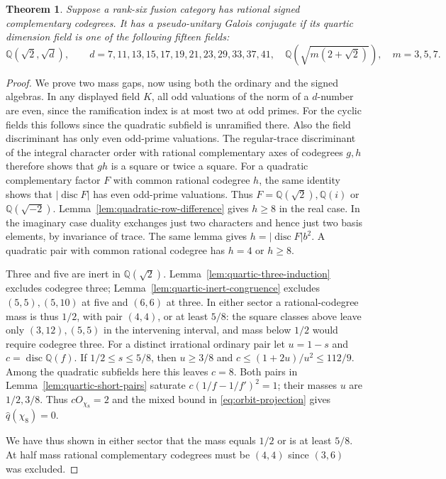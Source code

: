 \documentclass[11pt,reqno]{amsart}
\newtheorem{theorem}{Theorem}[section]
\theoremstyle{remark}\newtheorem{remark}[theorem]{Remark}
\numberwithin{equation}{section}
\begin{document}
\begin{theorem}\label{thm:quartic-fifteen-rational}
Suppose a rank-six fusion category has rational signed complementary
codegrees. It has a pseudo-unitary Galois conjugate if its quartic
dimension field is one of the following fifteen fields:
\[
 \mathbb Q(\sqrt2,\sqrt d),\qquad
 d=7,11,13,15,17,19,21,23,29,33,37,41,\quad \mathbb Q\!\left(\sqrt{m(2+\sqrt2)}\right),\quad m=3,5,7 .
\]
\end{theorem}
\begin{proof}
We prove two mass gaps, now using both the ordinary and the signed
algebras. In any displayed field $K$, all odd valuations of the
norm of a $d$-number are even, since the ramification index is at
most two at odd primes. For the cyclic fields this follows since
the quadratic subfield is unramified there. Also the field
discriminant has only even odd-prime valuations. The regular-trace
discriminant of the integral character order with rational
complementary axes of codegrees $g,h$ therefore shows that $gh$ is a
square or twice a square. For a quadratic complementary factor $F$
with common rational codegree $h$, the same identity shows that
$|\operatorname{disc}F|$ has even odd-prime valuations. Thus
$F=\mathbb Q(\sqrt2),\mathbb Q(i)$ or $\mathbb Q(\sqrt{-2})$.
Lemma~\ref{lem:quadratic-row-difference} gives $h\ge8$ in the
real case. In the imaginary case duality exchanges just two
characters and hence just two basis elements, by invariance of
trace. The same lemma gives $h=|\operatorname{disc}F|b^2$. A quadratic pair with common rational
codegree has $h=4$ or $h\ge8$.

Three and five are inert in $\mathbb Q(\sqrt2)$.
Lemma~\ref{lem:quartic-three-induction} excludes codegree three;
Lemma~\ref{lem:quartic-inert-congruence} excludes $(5,5),(5,10)$
at five and $(6,6)$ at three. In either sector a rational-codegree
mass is thus $1/2$, with pair $(4,4)$, or at least $5/8$:
the square classes above leave only $(3,12),(5,5)$ in the
intervening interval, and mass below $1/2$ would require codegree three.
For a distinct irrational ordinary pair let $u=1-s$ and
$c=\operatorname{disc}\mathbb Q(f)$. If $1/2\le s\le5/8$,
then $u\ge3/8$ and $c\le(1+2u)/u^2\le112/9$.
Among the quadratic subfields here this leaves $c=8$.
Both pairs in Lemma~\ref{lem:quartic-short-pairs} saturate
$c(1/f-1/f')^2=1$; their masses $u$ are $1/2,3/8$.
Thus $cO_{\chi_8}=2$ and the mixed bound
in \eqref{eq:orbit-projection} gives $\widehat q(\chi_8)=0$.

We have thus shown in either sector that the mass equals $1/2$
or is at least $5/8$. At half mass rational complementary
codegrees must be $(4,4)$ since $(3,6)$ was excluded.


\end{proof}
\end{document}
